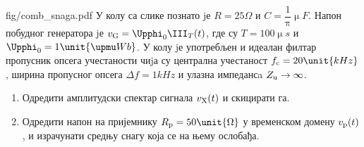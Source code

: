 \mnDifficult
\begin{slikaDesno}{fig/comb_snaga.pdf}
    \PID
    У колу са слике познато jе 
    $R = 25\unit{\Omega}$ и 
    $C = \dfrac{1}{\uppi} \unit{\upmu F}$.
    Напон побудног генератора jе 
    $v_{\rm G} = \Upphi_0 \III_T (t)$, где су 
    $T =100\unit{\upmu s}$ и 
    $\Upphi_0 = 1\unit{\upmu Wb}$. 
    У колу jе употребљен и идеалан филтар пропусник опсега учестаности чиjа су централна
    учестаност 
    $f_{\rm c} = 20\unit{kHz}$, ширина пропусног опсега 
    $\Delta f = 1\unit{kHz}$ и улазна импедансa 
    $Z_{\rm u} \to \infty$. 
\end{slikaDesno}

\begin{enumerate}[label=(\alph*)]
    \item Одредити амплитудски спектар сигнала $v_{\rm X}(t)$ и скицирати га.
    \item Одредити напон на пријемнику $R_{\rm p} = 50\unit{\Omega}$ у временском домену $v_{\rm p}(t)$, и израчунати 
    средњу снагу која се на њему ослобађа. 
    
\end{enumerate}

\RESENJE

